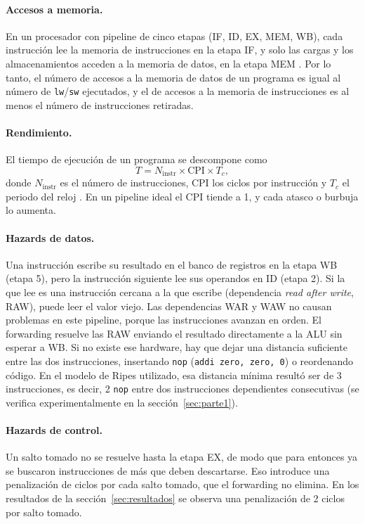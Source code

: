 \documentclass[11pt,a4paper]{article}
\begin{document}
\paragraph{Accesos a memoria.}
En un procesador con pipeline de cinco etapas (IF, ID, EX, MEM, WB), cada
instrucci\'on lee la memoria de instrucciones en la etapa IF, y solo las
cargas y los almacenamientos acceden a la memoria de datos, en la etapa MEM
\cite{harris,patterson}. Por lo tanto, el n\'umero de accesos a la memoria de
datos de un programa es igual al n\'umero de \texttt{lw}/\texttt{sw}
ejecutados, y el de accesos a la memoria de instrucciones es al menos el
n\'umero de instrucciones retiradas.

\paragraph{Rendimiento.}
El tiempo de ejecuci\'on de un programa se descompone como
\begin{equation}
  T = N_{\text{instr}} \times \text{CPI} \times T_c ,
\end{equation}
donde $N_{\text{instr}}$ es el n\'umero de instrucciones, CPI los ciclos por
instrucci\'on y $T_c$ el periodo del reloj \cite{harris,patterson}. En un
pipeline ideal el CPI tiende a 1, y cada atasco o burbuja lo aumenta.

\paragraph{Hazards de datos.}
Una instrucci\'on escribe su resultado en el banco de registros en la etapa WB
(etapa 5), pero la instrucci\'on siguiente lee sus operandos en ID (etapa 2).
Si la que lee es una instrucci\'on cercana a la que escribe (dependencia
\emph{read after write}, RAW), puede leer el valor viejo. Las dependencias
WAR y WAW no causan problemas en este pipeline, porque las instrucciones
avanzan en orden. El forwarding resuelve las RAW enviando el resultado
directamente a la ALU sin esperar a WB. Si no existe ese hardware, hay que dejar
una distancia suficiente entre las dos instrucciones, insertando \texttt{nop}
(\texttt{addi zero, zero, 0}) o reordenando c\'odigo. En el modelo de Ripes
utilizado, esa distancia m\'inima result\'o ser de 3 instrucciones, es decir,
2 \texttt{nop} entre dos instrucciones dependientes consecutivas (se verifica
experimentalmente en la secci\'on~\ref{sec:parte1}).

\paragraph{Hazards de control.}
Un salto tomado no se resuelve hasta la etapa EX, de modo que para entonces ya
se buscaron instrucciones de m\'as que deben descartarse. Eso introduce una
penalizaci\'on de ciclos por cada salto tomado, que el forwarding no elimina.
En los resultados de la secci\'on~\ref{sec:resultados} se observa una
penalizaci\'on de 2 ciclos por salto tomado.
\end{document}

